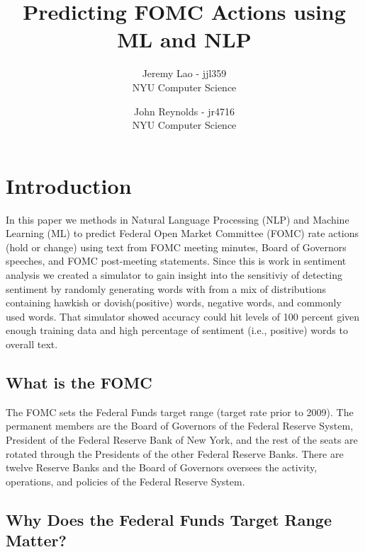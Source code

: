 \documentclass[11pt]{article}
\title{Predicting FOMC Actions using ML and NLP}
\author{
        Jeremy Lao - jjl359 \\
        NYU Computer Science \\
            \and
        John Reynolds - jr4716 \\
        NYU Computer Science \\
}
\begin{document}
\maketitle


\section{Introduction}
In this paper we methods in Natural Language Processing (NLP) and Machine Learning (ML) to predict Federal Open Market Committee (FOMC) rate actions (hold or change) using text from FOMC meeting minutes, Board of Governors speeches, and FOMC post-meeting statements.  Since this is work in sentiment analysis we created a simulator to gain insight into the sensitiviy of detecting sentiment by randomly generating words with from a mix of distributions containing hawkish or dovish(positive) words, negative words, and commonly used words.  That simulator showed accuracy could hit levels of 100 percent given enough training data and high percentage of sentiment (i.e., positive)  words to overall text.



\subsection{What is the FOMC}

The FOMC sets the Federal Funds target range (target rate prior to 2009).  The permanent members are the Board of Governors of the Federal Reserve System, President of the Federal Reserve Bank of New York, and the rest of the seats are rotated through the Presidents of the other Federal Reserve Banks.  There are twelve Reserve Banks and the Board of Governors oversees the activity, operations, and policies of the Federal Reserve System.   

\subsection{Why Does the Federal Funds Target Range Matter?}
\end{document}
